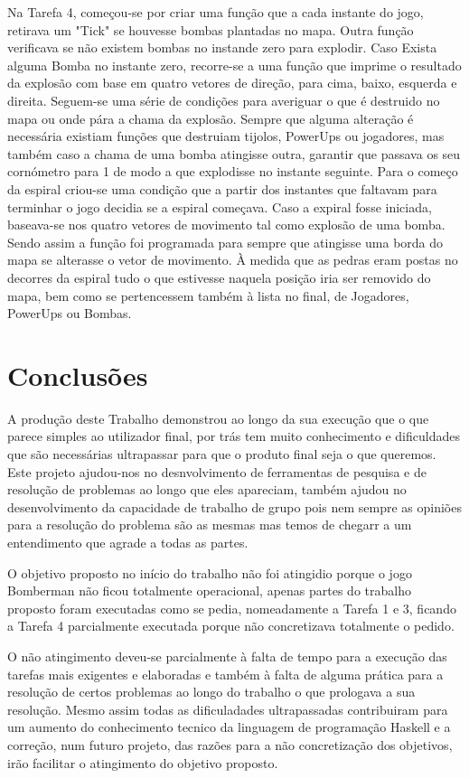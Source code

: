 \documentclass[a4paper]{article}
\begin{document}
Na Tarefa 4, começou-se por criar uma função que a cada instante do jogo, retirava um "Tick" se houvesse bombas plantadas no mapa. Outra 
função verificava se não existem bombas no instande zero para explodir. Caso Exista alguma Bomba no instante zero, recorre-se a uma função 
que imprime o resultado da explosão com base em quatro vetores de direção, para cima, baixo, esquerda e direita. Seguem-se uma série de 
condições para averiguar o que é destruido no mapa ou onde pára a chama da explosão. Sempre que alguma alteração é necessária existiam 
funções que destruiam tijolos, PowerUps ou jogadores, mas também caso a chama de uma bomba atingisse outra, garantir que passava os seu 
cornómetro para 1 de modo a que explodisse no instante seguinte. Para o começo da espiral criou-se uma condição que a partir dos instantes 
que faltavam para terminhar o jogo decidia se a espiral começava. Caso a expiral fosse iniciada, baseava-se nos quatro vetores de movimento
tal como explosão de uma bomba. Sendo assim a função foi programada para sempre que atingisse uma borda do mapa se alterasse o vetor de 
movimento. À medida que as pedras eram postas no decorres da espiral tudo o que estivesse naquela posição iria ser removido do mapa, bem como
se pertencessem também à lista no final, de Jogadores, PowerUps ou Bombas.   


\section{Conclusões}
\label{sec:conclusao}

A produção deste Trabalho demonstrou ao longo da sua execução que o que parece simples ao utilizador final, por trás tem muito conhecimento e 
dificuldades que são necessárias ultrapassar para que o produto final seja o que queremos. Este projeto ajudou-nos no desnvolvimento de 
ferramentas de pesquisa e de resolução de problemas ao longo que eles apareciam, também ajudou no desenvolvimento da capacidade de trabalho 
de grupo pois nem sempre as opiniões para a resolução do problema são as mesmas mas temos de chegarr a um entendimento que agrade a todas as 
partes.

O objetivo proposto no início do trabalho não foi atingidio porque o jogo Bomberman não ficou totalmente operacional, apenas partes do 
trabalho proposto foram executadas como se pedia, nomeadamente a Tarefa 1 e 3, ficando a Tarefa 4 parcialmente executada porque não 
concretizava totalmente o pedido.

O não atingimento deveu-se parcialmente à falta de tempo para a execução das tarefas mais exigentes e elaboradas e também à falta de alguma 
prática para a resolução de certos problemas ao longo do trabalho o que prologava a sua resolução. Mesmo assim todas as dificuladades
ultrapassadas contribuiram para um aumento do conhecimento tecnico da linguagem de programação Haskell e a correção, num futuro projeto, das
razões para a não concretização dos objetivos, irão facilitar o atingimento do objetivo proposto.  
\end{document}
